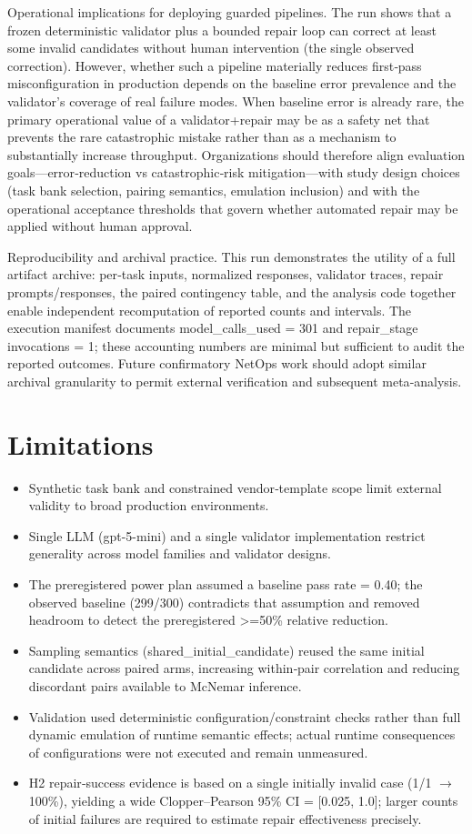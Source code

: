 \documentclass[conference]{IEEEtran}
\begin{document}
Operational implications for deploying guarded pipelines. The run shows that a frozen deterministic validator plus a bounded repair loop can correct at least some invalid candidates without human intervention (the single observed correction). However, whether such a pipeline materially reduces first‑pass misconfiguration in production depends on the baseline error prevalence and the validator's coverage of real failure modes. When baseline error is already rare, the primary operational value of a validator+repair may be as a safety net that prevents the rare catastrophic mistake rather than as a mechanism to substantially increase throughput. Organizations should therefore align evaluation goals---error‑reduction vs catastrophic‑risk mitigation---with study design choices (task bank selection, pairing semantics, emulation inclusion) and with the operational acceptance thresholds that govern whether automated repair may be applied without human approval.

Reproducibility and archival practice. This run demonstrates the utility of a full artifact archive: per‑task inputs, normalized responses, validator traces, repair prompts/responses, the paired contingency table, and the analysis code together enable independent recomputation of reported counts and intervals. The execution manifest documents model\_calls\_used = 301 and repair\_stage invocations = 1; these accounting numbers are minimal but sufficient to audit the reported outcomes. Future confirmatory NetOps work should adopt similar archival granularity to permit external verification and subsequent meta‑analysis.

\section{Limitations}
\begin{itemize}
\item Synthetic task bank and constrained vendor‑template scope limit external validity to broad production environments.
\item Single LLM (gpt-5-mini) and a single validator implementation restrict generality across model families and validator designs.
\item The preregistered power plan assumed a baseline pass rate = 0.40; the observed baseline (299/300) contradicts that assumption and removed headroom to detect the preregistered >=50\% relative reduction.
\item Sampling semantics (shared\_initial\_candidate) reused the same initial candidate across paired arms, increasing within‑pair correlation and reducing discordant pairs available to McNemar inference.
\item Validation used deterministic configuration/constraint checks rather than full dynamic emulation of runtime semantic effects; actual runtime consequences of configurations were not executed and remain unmeasured.
\item H2 repair‑success evidence is based on a single initially invalid case (1/1 \ensuremath{\rightarrow} 100\%), yielding a wide Clopper--Pearson 95\% CI = [0.025, 1.0]; larger counts of initial failures are required to estimate repair effectiveness precisely.
\end{itemize}
\end{document}
